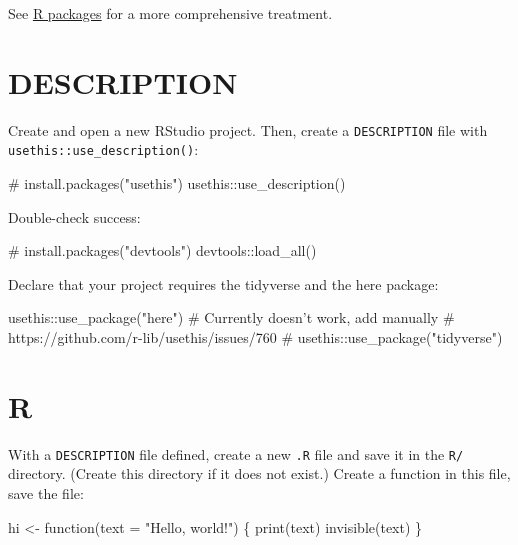 \documentclass[]{book}
\newenvironment{Shaded}{}{}
\newcommand{\CommentTok}[1]{\textcolor[rgb]{0.00,0.50,0.00}{#1}}
\newcommand{\ControlFlowTok}[1]{\textcolor[rgb]{0.00,0.00,1.00}{#1}}
\newcommand{\DataTypeTok}[1]{#1}
\newcommand{\KeywordTok}[1]{\textcolor[rgb]{0.00,0.00,1.00}{#1}}
\newcommand{\NormalTok}[1]{#1}
\newcommand{\OperatorTok}[1]{#1}
\newcommand{\StringTok}[1]{\textcolor[rgb]{0.00,0.50,0.50}{#1}}
\begin{document}
See \href{http://r-pkgs.had.co.nz/}{R packages} for a more comprehensive treatment.

\hypertarget{description}{%
\section{DESCRIPTION}\label{description}}

Create and open a new RStudio project.
Then, create a \texttt{DESCRIPTION} file with \texttt{usethis::use\_description()}:

\begin{Shaded}
\begin{Highlighting}[]
\CommentTok{# install.packages("usethis")}
\NormalTok{usethis}\OperatorTok{::}\KeywordTok{use_description}\NormalTok{()}
\end{Highlighting}
\end{Shaded}

Double-check success:

\begin{Shaded}
\begin{Highlighting}[]
\CommentTok{# install.packages("devtools")}
\NormalTok{devtools}\OperatorTok{::}\KeywordTok{load_all}\NormalTok{()}
\end{Highlighting}
\end{Shaded}

Declare that your project requires the tidyverse and the here package:

\begin{Shaded}
\begin{Highlighting}[]
\NormalTok{usethis}\OperatorTok{::}\KeywordTok{use_package}\NormalTok{(}\StringTok{"here"}\NormalTok{)}
\CommentTok{# Currently doesn't work, add manually}
\CommentTok{# https://github.com/r-lib/usethis/issues/760}
\CommentTok{# usethis::use_package("tidyverse")}
\end{Highlighting}
\end{Shaded}

\hypertarget{r}{%
\section{R}\label{r}}

With a \texttt{DESCRIPTION} file defined, create a new \texttt{.R} file and save it in the \texttt{R/} directory.
(Create this directory if it does not exist.)
Create a function in this file, save the file:

\begin{Shaded}
\begin{Highlighting}[]
\NormalTok{hi <-}\StringTok{ }\ControlFlowTok{function}\NormalTok{(}\DataTypeTok{text =} \StringTok{"Hello, world!"}\NormalTok{) \{}
  \KeywordTok{print}\NormalTok{(text)}
  \KeywordTok{invisible}\NormalTok{(text)}
\NormalTok{\}}
\end{Highlighting}
\end{Shaded}
\end{document}
